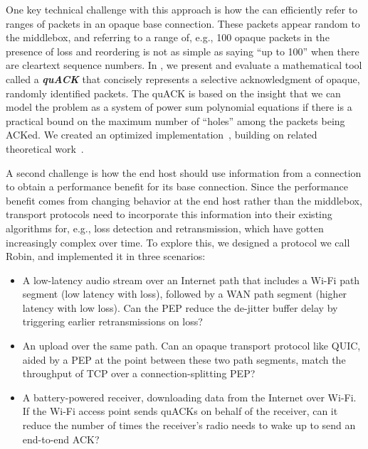 One key technical challenge with this approach is how the \sys can
efficiently refer to ranges of packets in an opaque base connection. These
packets appear random to the middlebox, and referring to a range of, e.g., 100 opaque
packets in the presence of loss and reordering is not as simple as saying
``up to 100'' when there are cleartext sequence numbers.
In , we present and
evaluate a mathematical tool called a \emph{\bf quACK} that concisely
represents a selective acknowledgment of opaque, randomly identified
packets. The quACK is based on the insight that we can model the
problem as a system of power sum polynomial equations if there is a
practical bound on the maximum number of ``holes'' among the
packets being ACKed. We created an optimized implementation~\cite{quack-github},
building on related theoretical
work~\cite{eppstein2011straggler,minsky2003set,karpovsky2003data}.

A second challenge is how the end host should use information from a
\sys connection to obtain a performance benefit for its base connection.
Since the performance benefit comes from changing behavior at the end host
rather than the middlebox, transport protocols need to incorporate this
information into their existing algorithms for, e.g., loss detection and
retransmission, which have gotten increasingly complex over time.
To explore this, we designed a \sys protocol we call Robin, and implemented
it in three scenarios:
\begin{itemize}[noitemsep,topsep=2pt]
\item A low-latency audio stream over an Internet path that includes a Wi-Fi path segment
  (low latency with loss), followed by a WAN path segment (higher latency
  with low loss). Can the \sys PEP reduce the de-jitter buffer delay
  by triggering earlier retransmissions on loss?

\item An upload over the same path. Can an opaque transport protocol like QUIC,
  aided by a \sys PEP at the point between these two path segments, match
  the throughput of TCP over a connection-splitting PEP?

\item A battery-powered receiver, downloading data from the Internet over Wi-Fi.
  If the Wi-Fi access point sends \sys quACKs on behalf of the receiver,
  can it reduce the number of times the receiver's radio needs to wake up
  to send an end-to-end ACK?
\end{itemize}

